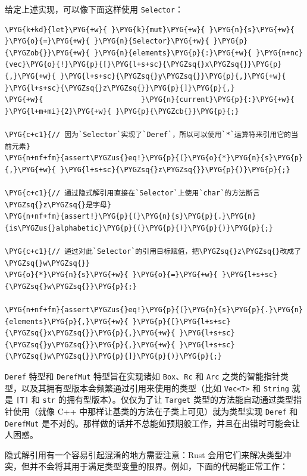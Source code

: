 给定上述实现，可以像下面这样使用 \texttt{Selector}：

\begin{Verbatim}[commandchars=\\\{\},breaklines=true,breakanywhere=true,fontsize=\codefont,xleftmargin=17bp]
\PYG{k+kd}{let}\PYG{+w}{ }\PYG{k}{mut}\PYG{+w}{ }\PYG{n}{s}\PYG{+w}{ }\PYG{o}{=}\PYG{+w}{ }\PYG{n}{Selector}\PYG{+w}{ }\PYG{p}{\PYGZob{}}\PYG{+w}{ }\PYG{n}{elements}\PYG{p}{:}\PYG{+w}{ }\PYG{n+nc}{vec}\PYG{o}{!}\PYG{p}{[}\PYG{l+s+sc}{\PYGZsq{}x\PYGZsq{}}\PYG{p}{,}\PYG{+w}{ }\PYG{l+s+sc}{\PYGZsq{}y\PYGZsq{}}\PYG{p}{,}\PYG{+w}{ }\PYG{l+s+sc}{\PYGZsq{}z\PYGZsq{}}\PYG{p}{]}\PYG{p}{,}
\PYG{+w}{                       }\PYG{n}{current}\PYG{p}{:}\PYG{+w}{ }\PYG{l+m+mi}{2}\PYG{+w}{ }\PYG{p}{\PYGZcb{}}\PYG{p}{;}

\PYG{c+c1}{// 因为`Selector`实现了`Deref`，所以可以使用`*`运算符来引用它的当前元素}
\PYG{n+nf+fm}{assert\PYGZus{}eq!}\PYG{p}{(}\PYG{o}{*}\PYG{n}{s}\PYG{p}{,}\PYG{+w}{ }\PYG{l+s+sc}{\PYGZsq{}z\PYGZsq{}}\PYG{p}{)}\PYG{p}{;}

\PYG{c+c1}{// 通过隐式解引用直接在`Selector`上使用`char`的方法断言\PYGZsq{}z\PYGZsq{}是字母}
\PYG{n+nf+fm}{assert!}\PYG{p}{(}\PYG{n}{s}\PYG{p}{.}\PYG{n}{is\PYGZus{}alphabetic}\PYG{p}{(}\PYG{p}{)}\PYG{p}{)}\PYG{p}{;}

\PYG{c+c1}{// 通过对此`Selector`的引用目标赋值，把\PYGZsq{}z\PYGZsq{}改成了\PYGZsq{}w\PYGZsq{}}
\PYG{o}{*}\PYG{n}{s}\PYG{+w}{ }\PYG{o}{=}\PYG{+w}{ }\PYG{l+s+sc}{\PYGZsq{}w\PYGZsq{}}\PYG{p}{;}

\PYG{n+nf+fm}{assert\PYGZus{}eq!}\PYG{p}{(}\PYG{n}{s}\PYG{p}{.}\PYG{n}{elements}\PYG{p}{,}\PYG{+w}{ }\PYG{p}{[}\PYG{l+s+sc}{\PYGZsq{}x\PYGZsq{}}\PYG{p}{,}\PYG{+w}{ }\PYG{l+s+sc}{\PYGZsq{}y\PYGZsq{}}\PYG{p}{,}\PYG{+w}{ }\PYG{l+s+sc}{\PYGZsq{}w\PYGZsq{}}\PYG{p}{]}\PYG{p}{)}\PYG{p}{;}
\end{Verbatim}

\texttt{Deref} 特型和 \texttt{DerefMut} 特型旨在实现诸如 \texttt{Box}、\texttt{Rc} 和 \texttt{Arc} 之类的智能指针类型，以及其拥有型版本会频繁通过引用来使用的类型（比如 \texttt{Vec<T>} 和 \texttt{String} 就是 \texttt{[T]} 和 \texttt{str} 的拥有型版本）。仅仅为了让 \texttt{Target} 类型的方法能自动通过类型指针使用（就像 C++ 中那样让基类的方法在子类上可见）就为类型实现 \texttt{Deref} 和 \texttt{DerefMut} 是不对的。那样做的话并不总能如预期般工作，并且在出错时可能会让人困惑。

隐式解引用有一个容易引起混淆的地方需要注意：Rust 会用它们来解决类型冲突，但并不会将其用于满足类型变量的限界。例如，下面的代码能正常工作：

